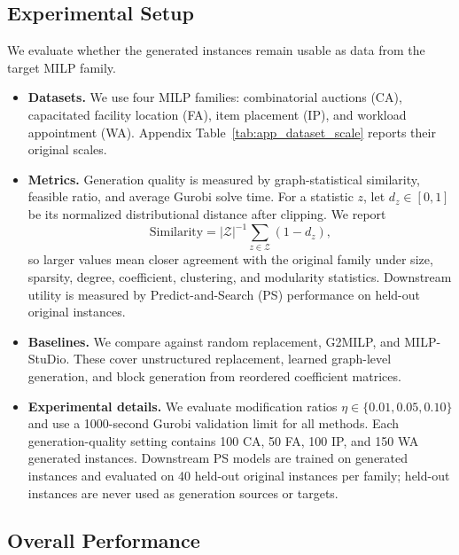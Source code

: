 \documentclass[letterpaper]{article}
\begin{document}
\subsection{Experimental Setup}

We evaluate whether the generated instances remain usable as data from the target MILP family.

\begin{itemize}
\item \textbf{Datasets.} We use four MILP families: combinatorial auctions (CA), capacitated facility location (FA), item placement (IP), and workload appointment (WA). Appendix Table~\ref{tab:app_dataset_scale} reports their original scales.
\item \textbf{Metrics.} Generation quality is measured by graph-statistical similarity, feasible ratio, and average Gurobi solve time. For a statistic $z$, let $d_z\in[0,1]$ be its normalized distributional distance after clipping. We report
\begin{equation}
\mathrm{Similarity}=|\mathcal{Z}|^{-1}\sum_{z\in\mathcal{Z}}(1-d_z),
\end{equation}
so larger values mean closer agreement with the original family under size, sparsity, degree, coefficient, clustering, and modularity statistics. Downstream utility is measured by Predict-and-Search (PS) performance on held-out original instances.
\item \textbf{Baselines.} We compare against random replacement, G2MILP, and MILP-StuDio. These cover unstructured replacement, learned graph-level generation, and block generation from reordered coefficient matrices.
\item \textbf{Experimental details.} We evaluate modification ratios $\eta\in\{0.01,0.05,0.10\}$ and use a 1000-second Gurobi validation limit for all methods. Each generation-quality setting contains 100 CA, 50 FA, 100 IP, and 150 WA generated instances. Downstream PS models are trained on generated instances and evaluated on 40 held-out original instances per family; held-out instances are never used as generation sources or targets.
\end{itemize}

\subsection{Overall Performance}
\end{document}
